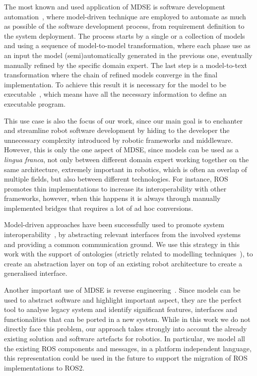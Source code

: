 The most known and used application of MDSE is software development automation~\cite{sendall2003model}, where model-driven technique are employed to automate as much as possible of the software development process, from requirement definition to the system deployment. The process starts by a single or a collection of models and using a sequence of model-to-model transformation, where each phase use as an input the model (semi)automatically generated in the previous one, eventually manually refined by the specific domain expert. The last step is a model-to-text transformation where the chain of refined models converge in the final implementation. To achieve this result it is necessary for the model to be executable~\cite{mellor2002executable}, which means have all the necessary information to define an executable program.

This use case is also the focus of our work, since our main goal is to enchanter and streamline robot software development by hiding to the developer the unnecessary complexity introduced by robotic frameworks and middleware. However, this is only the one aspect of MDSE, since models can be used as a \textit{lingua franca}, not only between different domain expert working together on the same architecture, extremely important in robotics, which is often an overlap of multiple fields, but also between different technologies. For instance, ROS promotes thin implementations to increase its interoperability with other frameworks, however, when this happens it is always through manually implemented bridges that requires a lot of ad hoc conversions.

Model-driven approaches have been successfully used to promote system interoperability~\cite{chungoora2013model}, by abstracting relevant interfaces from the involved systems and providing a common communication ground. We use this strategy in this work with the support of ontologies (strictly related to modelling techniques~\cite{guizzardi2007ontology}), to create an abstraction layer on top of an existing robot architecture to create a generalised interface.

Another important use of MDSE is reverse engineering~\cite{bruneliere2010modisco, rugaber2004model}. Since models can be used to abstract software and highlight important aspect, they are the perfect tool to analyse legacy system and identify significant features, interfaces and functionalities that can be ported in a new system. While in this work we do not directly face this problem, our approach takes strongly into account the already existing solution and software artefacts for robotics. In particular, we model all the existing ROS components and messages, in a platform independent language, this representation could be used in the future to support the migration of ROS implementations to ROS2.

